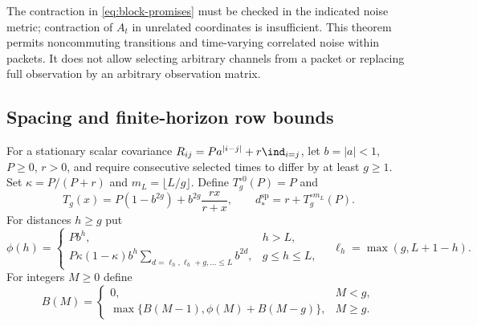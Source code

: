 The contraction in \eqref{eq:block-promises} must be checked in the indicated
noise metric; contraction of $A_t$ in unrelated coordinates is insufficient.
This theorem permits noncommuting transitions and time-varying correlated
noise within packets. It does not allow selecting arbitrary channels from a
packet or replacing full observation by an arbitrary observation matrix.

\subsection{Spacing and finite-horizon row bounds}
\label{subsec:spacing-locality}
For a stationary scalar covariance
$R_{ij}=Pa^{|i-j|}+r\ind_{i=j}$, let $b=|a|<1$, $P\ge0$, $r>0$, and
require consecutive selected times to differ by at least $g\ge1$.
Set $\kappa=P/(P+r)$ and $m_L=\lfloor L/g\rfloor$.
Define $T_g^{\circ0}(P)=P$ and
\begin{equation}
 T_g(x)=P(1-b^{2g})+b^{2g}\frac{rx}{r+x},\qquad
 d_*^{\mathrm{sp}}=r+T_g^{\circ m_L}(P).
 \label{eq:spacing-floor}
\end{equation}
For distances $h\ge g$ put
\begin{equation}
 \phi(h)=\begin{cases}
 P b^h,&h>L,\\
 P\kappa(1-\kappa)b^h
 \displaystyle\sum_{d=\ell_h,\ell_h+g,\ldots\le L} b^{2d},&g\le h\le L,
 \end{cases}\quad \ell_h=\max(g,L+1-h).
 \label{eq:spacing-pair-majorant}
\end{equation}
For integers $M\ge0$ define
\begin{equation}
 B(M)=\begin{cases}0,&M<g,\\
 \max\{B(M-1),\phi(M)+B(M-g)\},&M\ge g.
 \end{cases}
 \label{eq:spacing-row-dp}
\end{equation}

